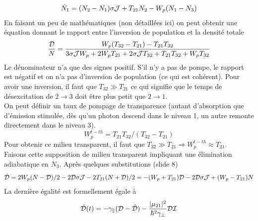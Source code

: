 \begin{equation}
{\dot N_1} = ({N_2} - {N_1})\sigma {{\cal J}} + {T_{21}}{N_2} - {W_p}({N_1} - {N_3})
\end{equation}
En faisant un peu de mathématiques (non détaillées ici) on peut obtenir une équation donnant le 
rapport entre l'inversion de population et la densité totale
\begin{equation}
\frac{{{\cal D}}}{N} = \frac{{{W_p}({T_{32}} - {T_{21}}) - {T_{21}}{T_{32}}}}{{3\sigma {{\cal J}}{W_p} + 2{W_p}{T_{21}} + 2\sigma {{\cal J}}{T_{32}} + {T_{21}}{T_{32}} + {W_p}{T_{32}}}}
\end{equation}
Le dénominateur n'a que des signes positif. S'il n'y a pas de pompe, le rapport est négatif et on 
n'a pas d'inversion de population (ce qui est cohérent). Pour avoir une inversion, il faut que $T_{32}
\gg T_{21}$ ce qui signifie que le temps de désexcitation de $2\to3$ doit être plus petit que 
$2\to1$.\\

On peut définir un taux de pompage de transparence (autant d'absorption que d'émission stimulée, dès 
qu'un photon descend dans le niveau 1, un autre remonte directement dans le niveau 3). 
\begin{equation}
W_p^{t - th} = {T_{21}}{T_{32}}/({T_{32}} - {T_{21}})
\end{equation}
Pour obtenir ce milieu transparent, il faut que $T_{32}\gg T_{21} \Rightarrow W_p^{t - th} \approx {T_{21}}$. \\

Faisons cette supposition de milieu transparent impliquant une élimination adiabatique en $N_3$. Après 
quelques substitutions (slide 8)
\begin{equation}
{\dot {\cal D}} = 2{W_p}(N - {{\cal D}})/2 - 2{{\cal D}}\sigma {{\cal J}} - 2{T_{21}}(N + {{\cal D}})/2 =  - ({W_p} + {T_{21}}){{\cal D}} - 2{{\cal D}}\sigma {{\cal J}} + ({W_p} - {T_{21}})N
\end{equation}
La dernière égalité est formellement égale à
\begin{equation}
\dot {\cal D}(t) =  - {\gamma _\parallel }({{\cal D}} - {\hat {\cal D}}) - \frac{{|{\mu _{21}}{|^2}}}{{{\hbar ^2}{\gamma _ \bot }}}{\cal D}{{\cal I}}
\end{equation}

